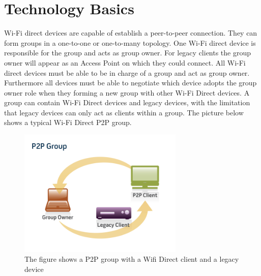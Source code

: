 \section{Technology Basics}
\label{sec:TechnologyBascs}
Wi-Fi direct devices are capable of establish a peer-to-peer connection. They can form groups in a one-to-one or one-to-many topology. One Wi-Fi direct device is responsible for the group and acts as group owner. For legacy clients the group owner will appear as an Access Point on which they could connect.
All Wi-Fi direct devices must be able to be in charge of a group and act as group owner. Furthermore all devices must be able to negotiate which device adopts the group owner role when they forming a new group with other Wi-Fi Direct devices. A group can contain Wi-Fi Direct devices and legacy devices, with the limitation that legacy devices can only act as clients within a group. The picture below shows a typical Wi-Fi Direct P2P group.

\begin{figure}[ht]
	\centering
  \includegraphics[width=0.7\textwidth]{images/wifidirect.png}
	\caption{The figure shows a P2P group with a Wifi Direct client and a legacy device}
	\label{fig1}
\end{figure}